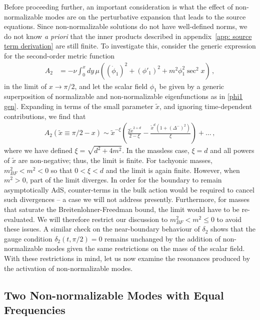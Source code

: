 \documentclass[letterpaper,11pt]{article}
\begin{document}
Before proceeding further, an important consideration is what the effect of non-normalizable modes are on the perturbative expansion that leads to the source equations. Since non-normalizable solutions do not have well-defined norms, we do not know \emph{a priori} that the inner products described in appendix~\ref{app: source term derivation} are still finite. To investigate this, consider the generic expression for the second-order metric function
\begin{align}
A_2 &= - \nu \int^x_0 dy \, \mu \left( (\dot \phi_1)^2 + (\phi'_1)^2 + m^2 \phi_1^2 \sec^2 x \right) \, ,
\end{align}
in the limit of $x \to \pi/2$, and let the scalar field $\phi_1$ be given by a generic superposition of normalizable and non-normalizable eigenfunctions as in \eqref{phi1 gen}. Expanding in terms of the small parameter $\tilde x$, and ignoring time-dependent contributions, we find that
\begin{align}
A_2 (\tilde x \equiv \pi /2 - x) \sim \tilde{x}^{-\xi} \left( \frac{2 \tilde{x}^{2+d}}{2 - \xi} - \frac{\tilde{x}^d (1 + \left(\Delta^{-}\right)^2)}{\xi} \right) + \ldots \, ,
\end{align}
where we have defined $\xi = \sqrt{d^2 + 4m^2}$. In the massless case, $\xi = d$ and all powers of $\tilde{x}$ are non-negative; thus, the limit is finite. For tachyonic masses, $m^2_{BF} < m^2 < 0$ so that $0 < \xi < d$ and the limit is again finite. However, when $m^2 > 0$, part of the limit diverges. In order for the boundary to remain asymptotically AdS, counter-terms in the bulk action would be required to cancel such divergences -- a case we will not address presently. Furthermore, for masses that saturate the Breitenlohner-Freedman bound, the limit would have to be re-evaluated. We will therefore restrict our discussion to $m^2_{BF} < m^2 \leq 0$ to avoid these issues. A similar check on the near-boundary behaviour of $\delta_2$ shows that the gauge condition ${\delta_2 (t, \pi/2) = 0}$ remains unchanged by the addition of non-normalizable modes given the same restrictions on the mass of the scalar field. With these restrictions in mind, let us now examine the resonances produced by the activation of non-normalizable modes.

\subsection{Two Non-normalizable Modes with Equal Frequencies}
\label{ssec: equalNN}
\end{document}
